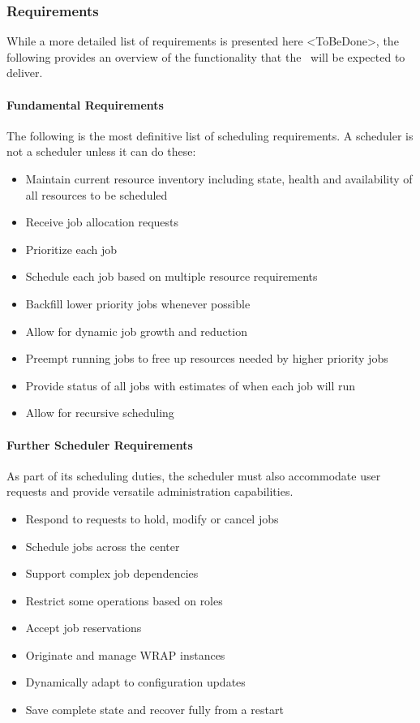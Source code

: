 \subsubsection{Requirements}

While a more detailed list of requirements is presented here
<ToBeDone>, the following provides an overview of the functionality
that the \ngjs\ will be expected to deliver.

\paragraph{Fundamental Requirements}

The following is the most definitive list of scheduling requirements.
A scheduler is not a scheduler unless it can do these:

\begin{itemize}
  \item Maintain current resource inventory including state, health
    and availability of all resources to be scheduled
  \item Receive job allocation requests
  \item Prioritize each job
  \item Schedule each job based on multiple resource requirements
  \item Backfill lower priority jobs whenever possible
  \item Allow for dynamic job growth and reduction
  \item Preempt running jobs to free up resources needed by higher priority jobs
  \item Provide status of all jobs with estimates of when each job will run
  \item Allow for recursive scheduling
\end{itemize}

\paragraph{Further Scheduler Requirements}

As part of its scheduling duties, the scheduler must also accommodate
user requests and provide versatile administration capabilities.

\begin{itemize}
  \item Respond to requests to hold, modify or cancel jobs
  \item Schedule jobs across the center
  \item Support complex job dependencies
  \item Restrict some operations based on roles
  \item Accept job reservations
  \item Originate and manage WRAP instances
  \item Dynamically adapt to configuration updates
  \item Save complete state and recover fully from a restart
\end{itemize}

